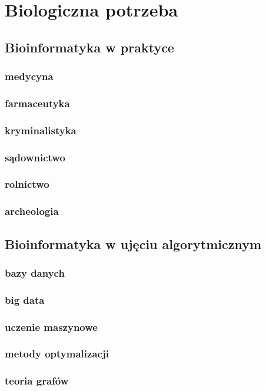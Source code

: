 \chapter{Biologiczna potrzeba}
\label{section:biologiny_wstep}

\section{Bioinformatyka w praktyce}
\subsection{medycyna}
\subsection{farmaceutyka}
\subsection{kryminalistyka}
\subsection{sądownictwo}
\subsection{rolnictwo}
\subsection{archeologia}

\section{Bioinformatyka w ujęciu algorytmicznym}
\subsection{bazy danych}
\subsection{big data}
\subsection{uczenie maszynowe}
\subsection{metody optymalizacji}
\subsection{teoria grafów}

